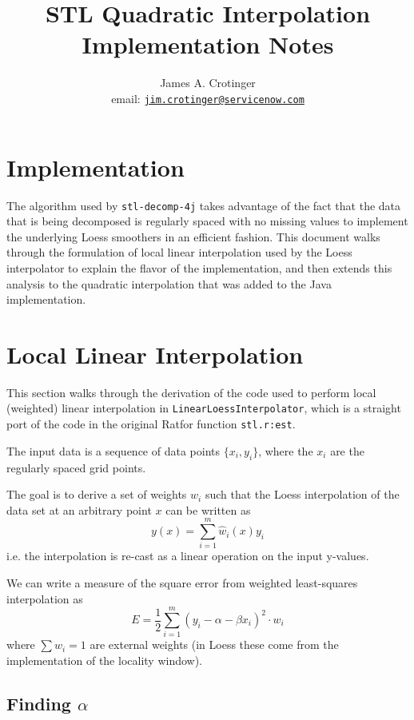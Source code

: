 \documentclass[oneside]{tufte-handout}
\title{STL Quadratic Interpolation \\ Implementation Notes}
\author{James A. Crotinger \\ email: \href{mailto:jim.crotinger@servicenow.com}{\tt jim.crotinger@servicenow.com}}
\newcommand\code[1]{\texttt{#1}}
\begin{document}
\maketitle%

\section{Implementation}

\begin{fullwidth}
The algorithm used by \code{stl-decomp-4j} takes advantage of the fact that the data that is being decomposed is regularly spaced with no missing values to implement the underlying Loess smoothers in an efficient fashion. This document walks through the formulation of local linear interpolation used by the Loess interpolator to explain the flavor of the implementation, and then extends this analysis to the quadratic interpolation that was added to the Java implementation.

\section{Local Linear Interpolation}

This section walks through the derivation of the code used to perform local (weighted) linear interpolation in \code{LinearLoessInterpolator}, which is a straight port of the code in the original Ratfor function \code{stl.r:est}.

The input data is a sequence of data points $\{x_i, y_i\}$, where the $x_i$ are the regularly spaced grid points.

The goal is to derive a set of weights $w_i$ such that the Loess interpolation of the data set at an arbitrary point $x$ can be written as
\begin{equation*}
  y(x) = \sum_{i = 1}^m \hat{w}_i(x) y_i
\end{equation*}
i.e. the interpolation is re-cast as a linear operation on the input y-values.

We can write a measure of the square error from weighted least-squares interpolation as
\begin{equation*}
E = {\frac{1}{2}} \sum_{i=1}^m (y_i - \alpha - \beta x_i)^2 \cdot w_i
\end{equation*}
where $\sum w_i = 1$ are external weights (in Loess these come from the implementation of the locality window).

\subsection{Finding $\alpha$}


\end{fullwidth}
\end{document}
